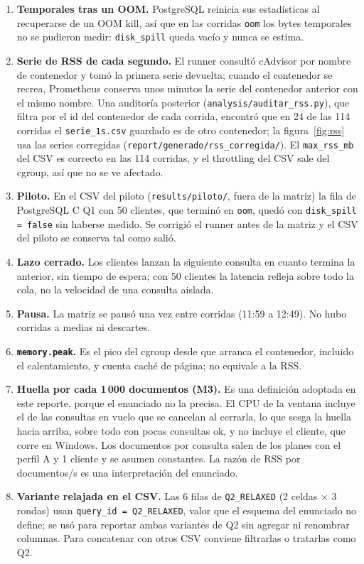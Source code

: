 \documentclass[11pt,a4paper]{article}
\newcommand{\cod}[1]{\texttt{#1}}
\begin{document}
\begin{enumerate}
\item \textbf{Temporales tras un OOM.} PostgreSQL reinicia sus estadísticas al
  recuperarse de un OOM kill, así que en las corridas \cod{oom} los bytes temporales no
  se pudieron medir: \cod{disk\_spill} queda vacío y nunca se estima.
\item \textbf{Serie de RSS de cada segundo.} El runner consultó cAdvisor por nombre de
  contenedor y tomó la primera serie devuelta; cuando el contenedor se recrea, Prometheus
  conserva unos minutos la serie del contenedor anterior con el mismo nombre. Una
  auditoría posterior (\cod{analysis/auditar\_rss.py}), que filtra por el id del
  contenedor de cada corrida, encontró que en 24 de las 114 corridas el
  \cod{serie\_1s.csv} guardado es de otro contenedor; la figura~\ref{fig:rss} usa las
  series corregidas (\cod{report/generado/rss\_corregida/}). El \cod{max\_rss\_mb} del
  CSV es correcto en las 114 corridas, y el throttling del CSV sale del cgroup, así que
  no se ve afectado.
\item \textbf{Piloto.} En el CSV del piloto (\cod{results/piloto/}, fuera de la matriz)
  la fila de PostgreSQL C Q1 con 50 clientes, que terminó en \cod{oom}, quedó con
  \cod{disk\_spill = false} sin haberse medido. Se corrigió el runner antes de la matriz y
  el CSV del piloto se conserva tal como salió.
\item \textbf{Lazo cerrado.} Los clientes lanzan la siguiente consulta en cuanto termina
  la anterior, sin tiempo de espera; con 50 clientes la latencia refleja sobre todo la
  cola, no la velocidad de una consulta aislada.
\item \textbf{Pausa.} La matriz se pausó una vez entre corridas (11:59 a 12:49). No hubo
  corridas a medias ni descartes.
\item \textbf{\cod{memory.peak}.} Es el pico del cgroup desde que arranca el contenedor,
  incluido el calentamiento, y cuenta caché de página; no equivale a la RSS.
\item \textbf{Huella por cada 1\,000 documentos (M3).} Es una definición adoptada en este
  reporte, porque el enunciado no la precisa. El CPU
  de la ventana incluye el de las consultas en vuelo que se cancelan al cerrarla, lo que
  sesga la huella hacia arriba, sobre todo con pocas consultas ok, y no incluye el
  cliente, que corre en Windows. Los documentos por consulta salen de los planes con el
  perfil A y 1 cliente y se asumen constantes. La razón de RSS por documentos/s es una
  interpretación del enunciado.
\item \textbf{Variante relajada en el CSV.} Las 6 filas de \cod{Q2\_RELAXED} (2 celdas
  $\times$ 3 rondas) usan \cod{query\_id = Q2\_RELAXED}, valor que el esquema del
  enunciado no define; se usó para reportar ambas variantes de Q2 sin agregar ni renombrar
  columnas. Para concatenar con otros CSV conviene filtrarlas o tratarlas como Q2.
\end{enumerate}
\end{document}
